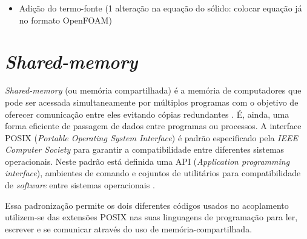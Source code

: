 \begin{itemize}
\item Adição do termo-fonte (1 alteração na equação do sólido: colocar equação já no formato OpenFOAM)
\end{itemize}

\section{\textit{Shared-memory}}

\textit{Shared-memory} (ou memória compartilhada) é a memória de computadores que pode ser
acessada simultaneamente por múltiplos programas com o objetivo de oferecer comunicação entre
eles evitando cópias redundantes \cite{Robbins2003}. É, ainda, uma forma eficiente de passagem de dados entre programas
ou processos. A interface POSIX (\textit{Portable Operating System Interface}) é padrão especificado pela
\textit{IEEE Computer Society} para garantir a compatibilidade entre diferentes sistemas operacionais. Neste padrão
está definida uma API (\textit{Application programming interface}), ambientes de comando e cojuntos de utilitários
para compatibilidade de \textit{software} entre sistemas operacionais \cite{Atlidakis2016}.

Essa padronização permite os dois diferentes códigos usados no acoplamento utilizem-se das extensões POSIX nas
suas linguagens de programação para ler, escrever e se comunicar através do uso de memória-compartilhada.










